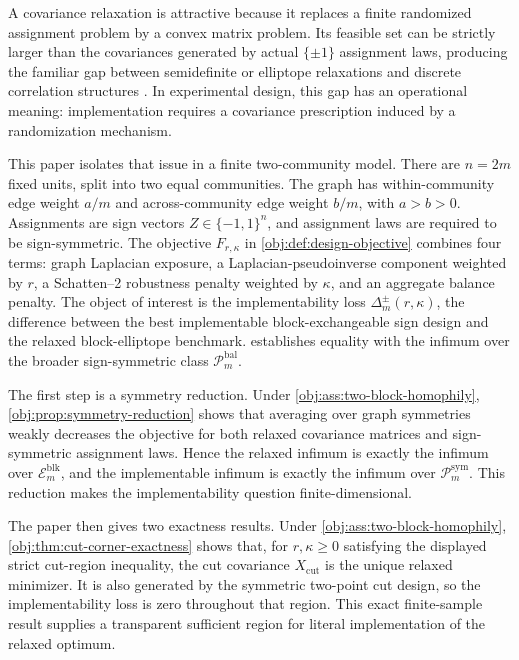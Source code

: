 A covariance relaxation is attractive because it replaces a finite randomized assignment problem by a convex matrix problem. Its feasible set can be strictly larger than the covariances generated by actual \(\{\pm1\}\) assignment laws, producing the familiar gap between semidefinite or elliptope relaxations and discrete correlation structures \citep{goemans1995,deza1997}. In experimental design, this gap has an operational meaning: implementation requires a covariance prescription induced by a randomization mechanism.

This paper isolates that issue in a finite two-community model. There are \(n=2m\) fixed units, split into two equal communities. The graph has within-community edge weight \(a/m\) and across-community edge weight \(b/m\), with \(a>b>0\). Assignments are sign vectors \(Z\in\{-1,1\}^n\), and assignment laws are required to be sign-symmetric. The objective \(F_{r,\kappa}\) in \cref{obj:def:design-objective} combines four terms: graph Laplacian exposure, a Laplacian-pseudoinverse component weighted by \(r\), a Schatten--2 robustness penalty weighted by \(\kappa\), and an aggregate balance penalty. The object of interest is the implementability loss \(\Delta_m^{\pm}(r,\kappa)\), the difference between the best implementable block-exchangeable sign design and the relaxed block-elliptope benchmark.  establishes equality with the infimum over the broader sign-symmetric class \(\mathcal P_m^{\mathrm{bal}}\).

The first step is a symmetry reduction. Under \cref{obj:ass:two-block-homophily}, \cref{obj:prop:symmetry-reduction} shows that averaging over graph symmetries weakly decreases the objective for both relaxed covariance matrices and sign-symmetric assignment laws. Hence the relaxed infimum is exactly the infimum over \(\mathcal E_m^{\mathrm{blk}}\), and the implementable infimum is exactly the infimum over \(\mathcal P_m^{\mathrm{sym}}\). This reduction makes the implementability question finite-dimensional.

The paper then gives two exactness results. Under \cref{obj:ass:two-block-homophily}, \cref{obj:thm:cut-corner-exactness} shows that, for \(r,\kappa\ge0\) satisfying the displayed strict cut-region inequality, the cut covariance \(X_{\mathrm{cut}}\) is the unique relaxed minimizer. It is also generated by the symmetric two-point cut design, so the implementability loss is zero throughout that region. This exact finite-sample result supplies a transparent sufficient region for literal implementation of the relaxed optimum.

